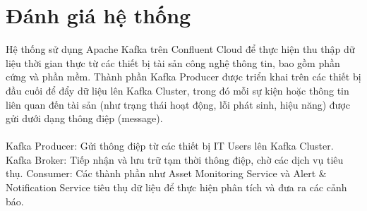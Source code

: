 \section{Đánh giá hệ thống}
\noindent Hệ thống sử dụng Apache Kafka trên Confluent Cloud để thực hiện thu thập dữ liệu thời gian thực từ các thiết bị tài sản công nghệ thông tin, bao gồm phần cứng và phần mềm. Thành phần Kafka Producer được triển khai trên các thiết bị đầu cuối để đẩy dữ liệu lên Kafka Cluster, trong đó mỗi sự kiện hoặc thông tin liên quan đến tài sản (như trạng thái hoạt động, lỗi phát sinh, hiệu năng) được gửi dưới dạng thông điệp (message). \\ \\
Kafka Producer: Gửi thông điệp từ các thiết bị IT Users lên Kafka Cluster.
Kafka Broker: Tiếp nhận và lưu trữ tạm thời thông điệp, chờ các dịch vụ tiêu thụ.
Consumer: Các thành phần như Asset Monitoring Service và Alert \& Notification Service tiêu thụ dữ liệu để thực hiện phân tích và đưa ra các cảnh báo.
